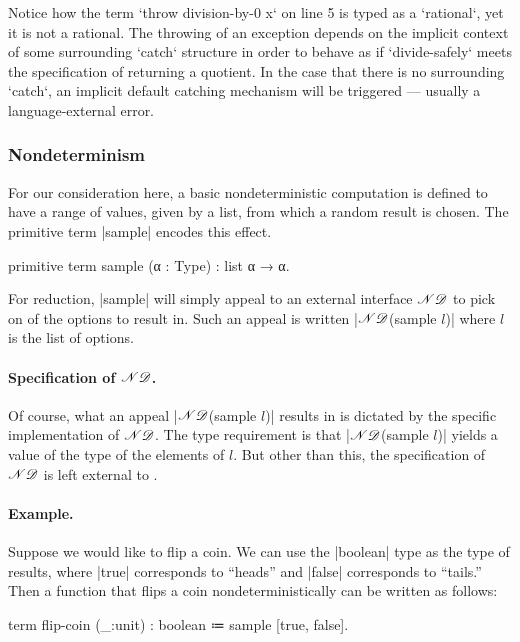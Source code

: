 Notice how the term \code`throw division-by-0 x` on line 5 is typed as a \code`rational`, yet it is not a rational.
The throwing of an exception depends on the implicit context of some surrounding \code`catch` structure in order to behave as if \code`divide-safely` meets the specification of returning a quotient.
In the case that there is no surrounding \code`catch`, an implicit default catching mechanism will be triggered --- usually a language-external error.

\subsubsection{Nondeterminism}

For our consideration here, a basic nondeterministic computation is defined to have a range of values, given by a list, from which a random result is chosen.
The primitive term \code|sample| encodes this effect.
\begin{program}[caption={Primitive for nondeterminism}]
primitive term sample (α : Type) : list α → α.
\end{program}
%
For reduction, \code|sample| will simply appeal to an external interface $\mathscr{ND}$ to pick on of the options to result in.
Such an appeal is written \code|$\mathscr{ND}$(sample $l$)| where $l$ is the list of options.


\paragraph{Specification of $\mathscr{ND}$.}
%
Of course, what an appeal \code|$\mathscr{ND}$(sample $l$)| results in is dictated by the specific implementation of $\mathscr{ND}$.
The type requirement is that \code|$\mathscr{ND}$(sample $l$)| yields a value of the type of the elements of $l$.
But other than this, the specification of $\mathscr{ND}$ is left external to \LangB.

\paragraph{Example.}
%
Suppose we would like to flip a coin.
We can use the \code|boolean| type as the type of results, where \code|true| corresponds to ``heads'' and \code|false| corresponds to ``tails.''
Then a function that flips a coin nondeterministically can be written as follows:
\begin{snippet}
term flip-coin (_:unit) : boolean ≔ sample [true, false].
\end{snippet}

